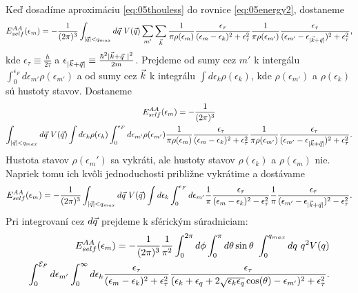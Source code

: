 Keď dosadíme aproximáciu \eqref{eq:05thouless} do rovnice \eqref{eq:05energy2}, dostaneme
\begin{align}
\label{eq:05energy3}
E_{self}^{AA}(\epsilon_m)= - \frac{1}{(2\pi)^3} \int_{|\vec{q}| < q_{max}} d\vec{q}\ V(\vec{q}) \sum_{m'}\sum_{\vec{k}}\frac{1}{\pi\rho(\epsilon_m)}\frac{\epsilon_\tau}{(\epsilon_m-\epsilon_k)^2+\epsilon_\tau^2}\frac{1}{\pi\rho(\epsilon_{m'})}\frac{\epsilon_\tau}{(\epsilon_{m'}-\epsilon_{|\vec{k}+\vec{q}|})^2+\epsilon_\tau^2} \text{,}
\end{align}
kde $\epsilon_\tau \equiv \frac{\hbar}{2\tau}$ a $\epsilon_{|\vec{k}+\vec{q}|} \equiv\frac{\hbar^2|\vec{k}+\vec{q}\ |^2}{2m}$.
Prejdeme od sumy cez $m'$ k intergálu $\int_0^{\epsilon_F} d\epsilon_{m'} \rho(\epsilon_{m'})$ a od sumy cez $\vec{k}$ k integrálu  $\int d\epsilon_k \rho(\epsilon_k)$, kde $\rho(\epsilon_{m'})$ a $\rho(\epsilon_k)$
sú hustoty stavov. Dostaneme
\begin{multline}
E_{self}^{AA}(\epsilon_m)= - \frac{1}{(2\pi)^3} \\
\int_{|\vec{q}| < q_{max}} d\vec{q}\ V(\vec{q})\int d\epsilon_k \rho(\epsilon_k) \int_0^{\epsilon_F} d\epsilon_{m'} \rho(\epsilon_{m'})\frac{1}{\pi\rho(\epsilon_m)}\frac{\epsilon_\tau}{(\epsilon_m-\epsilon_k)^2+
\epsilon_\tau^2}\frac{1}{\pi\rho(\epsilon_{m'})}\frac{\epsilon_\tau}{(\epsilon_{m'}-\epsilon_{|\vec{k}+\vec{q}|})^2+\epsilon_\tau^2} \text{.}
\end{multline}
Hustota stavov $\rho(\epsilon_m')$ sa vykráti, ale hustoty stavov $\rho(\epsilon_{k})$ a $\rho(\epsilon_m)$ nie. Napriek tomu ich kvôli jednoduchosti približne vykrátime a dostávame
\begin{align}
\label{eq:energy_vykratene}
E_{self}^{AA}(\epsilon_m)= - \frac{1}{(2\pi)^3} \int_{|\vec{q}| < q_{max}} d\vec{q}\ V(\vec{q})\int d\epsilon_k \int_0^{\epsilon_F} d\epsilon_{m'}\frac{1}{\pi}\frac{\epsilon_\tau}{(\epsilon_m-\epsilon_k)^2-\epsilon_\tau^2}\frac{1}{\pi}\frac{\epsilon_\tau}{(\epsilon_{m'}-\epsilon_{|\vec{k}+\vec{q}|})^2-\epsilon_\tau^2} \text{.}
\end{align}
Pri integrovaní cez $d\vec{q}$ prejdeme k sférickým súradniciam:
\begin{align}
\label{eq:05energy5}
\notag
E_{self}^{AA}(\epsilon_m)= - \frac{1}{(2\pi)^3}\frac{1}{\pi^2}\int_0^{2\pi}d\phi \int_0^\pi d\theta \sin\theta \ \int_0^{q_{max}} dq\ q^2 V(q)\\
\int_0^{\mathcal{E}_F} d\epsilon_{m'} \int_0^{\infty} d \epsilon_k \frac{\epsilon_\tau}{(\epsilon_m-\epsilon_k)^2+\epsilon_\tau^2}\frac{\epsilon_\tau}{(\epsilon_{k}+\epsilon_{q}+2\sqrt{\epsilon_{k}\epsilon_{q}}\cos(\theta)-\epsilon_{m'})^2+\epsilon_\tau^2} \text{.}
\end{align}
